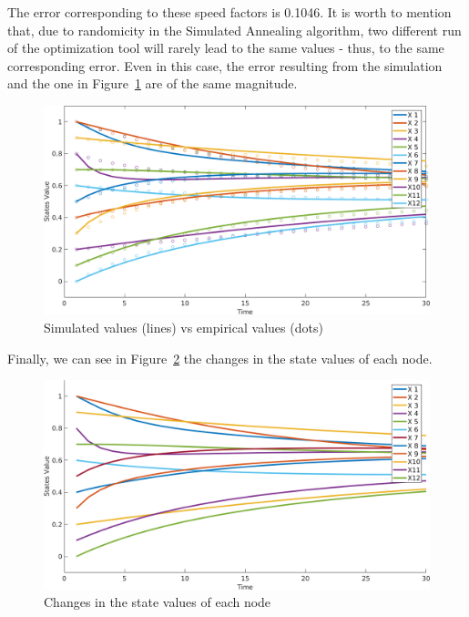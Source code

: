 \documentclass[a4paper]{article}
\begin{document}
The error corresponding to these speed factors is 0.1046. It is worth to mention that, due to randomicity in the Simulated Annealing algorithm, two different run of the optimization tool will rarely lead to the same values - thus, to the same corresponding error. Even in this case, the error resulting from the simulation and the one in Figure~\ref{fig:plotdiff2} are of the same magnitude.

\begin{figure}[H]
\center
\includegraphics[width=\textwidth]{res/img/plotdiff2_new}
\caption{Simulated values (lines) vs empirical values (dots)}
\label{fig:plotdiff2}
\end{figure}

Finally, we can see in Figure~\ref{fig:final} the changes in the state values of each node.

\begin{figure}[H]
\center
\includegraphics[width=\textwidth]{res/img/final}
\caption{Changes in the state values of each node}
\label{fig:final}
\end{figure}
\end{document}
